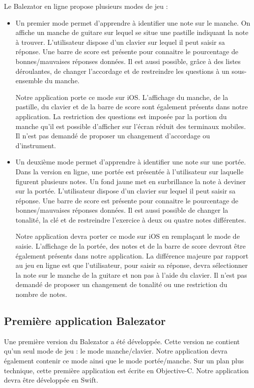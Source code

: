 \documentclass{scrreprt}
\begin{document}
Le Balezator en ligne propose plusieurs modes de jeu :
\begin{itemize}

\item Un premier mode permet d'apprendre à identifier une note sur le manche.
On affiche un manche de guitare sur lequel se situe une pastille indiquant la note à trouver.
L'utilisateur dispose d'un clavier sur lequel il peut saisir sa réponse.
Une barre de score est présente pour connaitre le pourcentage de bonnes/mauvaises réponses données.
Il est aussi possible, grâce à des listes déroulantes, de changer l'accordage et de restreindre les questions à un sous-ensemble du manche.\newline

Notre application porte ce mode sur iOS.
L'affichage du manche, de la pastille, du clavier et de la barre de score sont également présents dans notre application.
La restriction des questions est imposée par la portion du manche qu'il est possible d'afficher sur l'écran réduit des terminaux mobiles.
Il n'est pas demandé de proposer un changement d'accordage ou d'instrument.
\medbreak

\item Un deuxième mode permet d'apprendre à identifier une note sur une portée.
Dans la version en ligne, une portée est présentée à l'utilisateur sur laquelle figurent plusieurs notes.
Un fond jaune met en surbrillance la note à deviner sur la portée.
L'utilisateur dispose d'un clavier sur lequel il peut saisir sa réponse. 
Une barre de score est présente pour connaitre le pourcentage de bonnes/mauvaises réponses données.
Il est aussi possible de changer la tonalité, la clé et de restreindre l'exercice à deux ou quatre notes différentes.\newline

Notre application devra porter ce mode sur iOS en remplaçant le mode de saisie.
L'affichage de la portée, des notes et de la barre de score devront être également présents dans notre application.
La différence majeure par rapport au jeu en ligne est que l'utilisateur, pour saisir sa réponse, devra sélectionner la note sur le manche de la guitare et non pas à l'aide du clavier.
Il n'est pas demandé de proposer un changement de tonalité ou une restriction du nombre de notes.
\end{itemize}


\subsection{Première application Balezator}
Une première version du Balezator a été développée. Cette version ne contient qu’un seul mode de jeu : le mode manche/clavier. Notre application devra également contenir ce mode ainsi que le mode portée/manche. Sur un plan plus technique, cette première application est écrite en Objective-C. Notre application devra être développée en Swift. 
\end{document}
